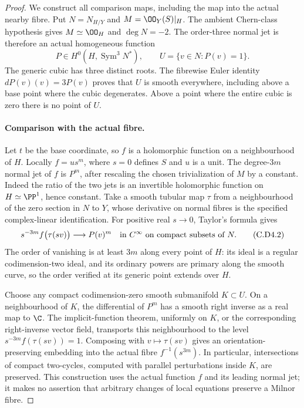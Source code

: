 \begin{proof}
We construct all comparison maps, including the map into the
actual nearby fibre. Put $N=N_{H/Y}$ and
$M=\OO_Y(S)|_H$. The ambient Chern-class hypothesis gives
$M\simeq\OO_H$ and $\deg N=-2$. The order-three normal jet is
therefore an actual homogeneous function
\[
 P\in H^0(H,\operatorname{Sym}^3N^*),\qquad
 U=\{v\in N:P(v)=1\}.
\tag{C.D4.1}\label{cdp:eq:C.D4.1}
\]
The generic cubic has three distinct roots. The fibrewise Euler
identity $dP(v)(v)=3P(v)$ proves that $U$ is smooth everywhere,
including above a base point where the cubic degenerates. Above
a point where the entire cubic is zero there is no point of $U$.

\paragraph{Comparison with the actual fibre.}
Let $t$ be the base coordinate, so $f$ is a holomorphic function
on a neighbourhood of $H$. Locally $f=u s^m$, where $s=0$
defines $S$ and $u$ is a unit. The degree-$3m$ normal jet of
$f$ is $P^m$, after rescaling the chosen trivialization of $M$
by a constant. Indeed the ratio of the two jets is an invertible
holomorphic function on $H\simeq\PP^1$, hence constant.
Take a smooth tubular map $\tau$ from a neighbourhood of the
zero section in $N$ to $Y$, whose derivative on normal fibres
is the specified complex-linear identification. For positive
real $s\to0$, Taylor's formula gives
\[
 s^{-3m}f\bigl(\tau(sv)\bigr)\longrightarrow P(v)^m
                 \quad\hbox{in }C^\infty\hbox{ on compact subsets of }N.
\tag{C.D4.2}\label{cdp:eq:C.D4.2}
\]
The order of vanishing is at least $3m$ along every point of
$H$: its ideal is a regular codimension-two ideal, and its
ordinary powers are primary along the smooth curve, so the
order verified at its generic point extends over $H$.

Choose any compact codimension-zero smooth submanifold
$K\subset U$. On a neighbourhood of $K$, the differential of
$P^m$ has a smooth right inverse as a real map to $\C$.
The implicit-function theorem, uniformly on $K$, or the
corresponding right-inverse vector field, transports this
neighbourhood to the level
$s^{-3m}f(\tau(sv))=1$. Composing with $v\mapsto\tau(sv)$
gives an orientation-preserving embedding into the actual
fibre $f^{-1}(s^{3m})$. In particular, intersections of compact
two-cycles, computed with parallel perturbations inside $K$,
are preserved. This construction uses the actual function
$f$ and its leading normal jet; it makes no assertion that
arbitrary changes of local equations preserve a Milnor fibre.


\end{proof}
